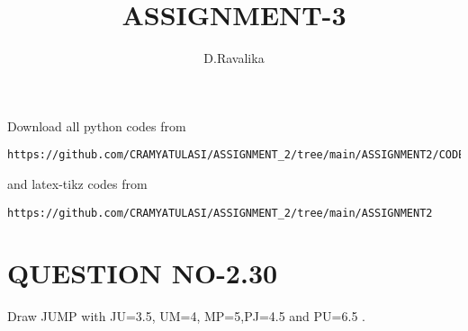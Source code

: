 \documentclass[journal,12pt,twocolumn]{IEEEtran}
\begin{document}
     \def\centbox#1{\makebox[0in]{#1}}
     \def\topbox#1{\raisebox{-\baselineskip}[0in][0in]{#1}}
     \def\midbox#1{\raisebox{-0.5\baselineskip}[0in][0in]{#1}}
\vspace{3cm}
\title{ASSIGNMENT-3}
\author{D.Ravalika}
\maketitle
\bigskip
\renewcommand{\thefigure}{\theenumi}
\renewcommand{\thetable}{\theenumi}
Download all python codes from 
\begin{lstlisting}
https://github.com/CRAMYATULASI/ASSIGNMENT_2/tree/main/ASSIGNMENT2/CODES
\end{lstlisting}
%
and latex-tikz codes from 
%
\begin{lstlisting}
https://github.com/CRAMYATULASI/ASSIGNMENT_2/tree/main/ASSIGNMENT2
\end{lstlisting}
%
\section{QUESTION NO-2.30}

\item Draw JUMP with JU=3.5, UM=4, MP=5,PJ=4.5 and PU=6.5 .
%
\end{document}

